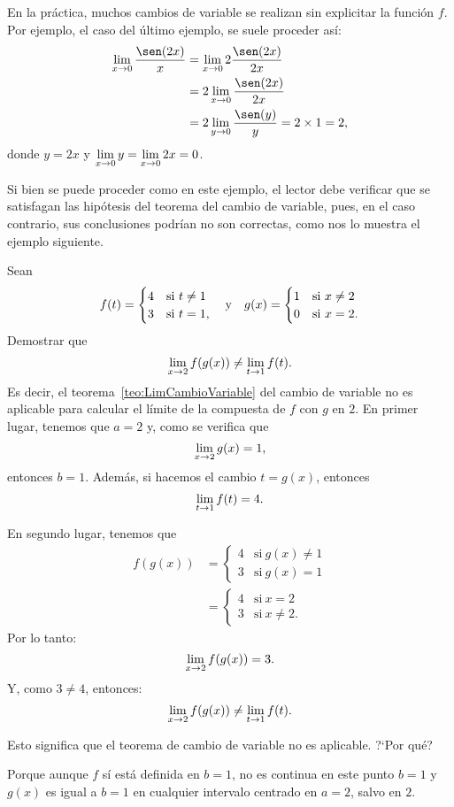 En la práctica, muchos cambios de variable se realizan sin explicitar la función $f$. Por ejemplo,
el caso del último ejemplo, se suele proceder así:
\begin{align*}
\limjc{\frac{\sen(2x)}{x}}{x}{0} &= \limjc{2\frac{\sen(2x)}{2x}}{x}{0} \\
&= 2\limjc{\frac{\sen(2x)}{2x}}{x}{0} \\
&= 2\limjc{\frac{\sen(y)}{y}}{y}{0} = 2\times 1 = 2,
\end{align*}
donde $y = 2x$ y $\displaystyle\limjc{y}{x}{0} = \limjc{2x}{x}{0} = 0$.

Si bien se puede proceder como en este ejemplo, el lector debe verificar que se satisfagan las
hipótesis del teorema del cambio de variable, pues, en el caso contrario, sus
conclusiones podrían no son correctas, como nos lo muestra el ejemplo siguiente.

\begin{exemplo}[Solución]{%
Sean
\begin{displaymath}
f(t)=
\begin{cases}
4 & \text{si $t\neq 1$}\\
3 & \text{si $t= 1$},
\end{cases} \yjc
g(x)=
\begin{cases}
1 & \text{si $x\neq 2$}\\
0 & \text{si $x= 2$}.
\end{cases}
\end{displaymath}
Demostrar que
\[
\limjc{f(g(x))}{x}{2} \neq \limjc{f(t)}{t}{1}.
\]
Es decir, el teorema~\ref{teo:LimCambioVariable} del cambio de variable no es aplicable para
calcular el límite de la compuesta de $f$ con $g$ en $2$.
}%
En primer lugar, tenemos que $a = 2$ y, como se verifica que
\[
\limjc{g(x)}{x}{2} = 1,
\]
entonces $b = 1$. Además, si hacemos el cambio $t = g(x)$, entonces
\[
\limjc{f(t)}{t}{1} = 4.
\]

En segundo lugar, tenemos que
\begin{align*}
f(g(x)) &=
\begin{cases}
4 & \text{si} \ g(x) \neq 1 \\
3 & \text{si} \ g(x) = 1
\end{cases}
\\
&=
\begin{cases}
4 & \text{si} \ x = 2 \\
3 & \text{si} \ x \neq 2.
\end{cases}
\end{align*}
Por lo tanto:
\[
\limjc{f(g(x))}{x}{2} = 3.
\]
Y, como $3 \neq 4$, entonces:
\[
\limjc{f(g(x))}{x}{2} \neq \limjc{f(t)}{t}{1}.
\]

Esto significa que el teorema de cambio de variable no es aplicable. ?`Por qué?

Porque aunque $f$ sí está definida en $b = 1$, no es continua en este punto $b = 1$ y $g(x)$ es igual a $b = 1$ en cualquier intervalo centrado en
$a = 2$, salvo en $2$.
\end{exemplo}

